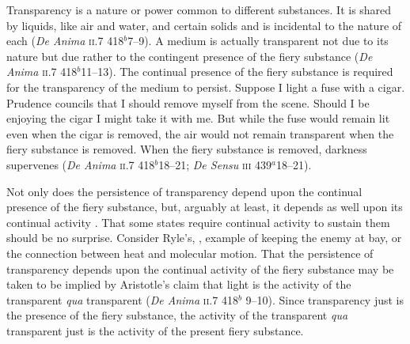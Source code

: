 Transparency is a nature or power common to different substances. It is shared by liquids, like air and water, and certain solids and is incidental to the nature of each (\emph{De Anima} \textsc{ii}.7 418\( ^{b} \)7--9). A medium is actually transparent not due to its nature but due rather to the contingent presence of the fiery substance (\emph{De Anima} \textsc{ii}.7 418\( ^{b} \)11--13). The continual presence of the fiery substance is required for the transparency of the medium to persist. Suppose I light a fuse with a cigar. Prudence councils that I should remove myself from the scene. Should I be enjoying the cigar I might take it with me. But while the fuse would remain lit even when the cigar is removed, the air would not remain transparent when the fiery substance is removed. When the fiery substance is removed, darkness supervenes (\emph{De Anima} \textsc{ii}.7 418\( ^{b} \)18--21; \emph{De Sensu} \textsc{iii} 439\( ^{a} \)18--21). 

Not only does the persistence of transparency depend upon the continual presence of the fiery substance, but, arguably at least, it depends as well upon its continual activity \citep[\emph{pace}][424]{Burnyeat:1995fk}. That some states require continual activity to sustain them should be no surprise. Consider Ryle's, \citeyearpar[149]{Ryle:1949qr}, example of keeping the enemy at bay, or the connection between heat and molecular motion. That the persistence of transparency depends upon the continual activity of the fiery substance may be taken to be implied by Aristotle's claim that light is the activity of the transparent \emph{qua} transparent (\emph{De Anima} \textsc{ii}.7 418\( ^{b} \) 9--10). Since transparency just is the presence of the fiery substance, the activity of the transparent \emph{qua} transparent just is the activity of the present fiery substance. 

